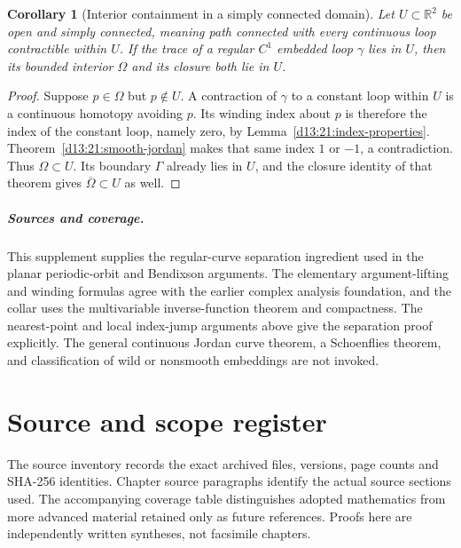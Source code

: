 \documentclass[11pt,oneside]{book}
\newtheorem{corollary}[theorem]{Corollary}
\theoremstyle{definition}
\theoremstyle{remark}\newtheorem{remark}[theorem]{Remark}
\newcommand{\R}{\mathbb R}\newcommand{\C}{\mathbb C}
\begin{document}
\begin{corollary}[Interior containment in a simply connected domain]\label{d13:21:domain-interior}
Let $U\subset\R^2$ be open and simply connected, meaning path connected
with every continuous loop contractible within $U$. If the trace of a
regular $C^1$ embedded loop $\gamma$ lies in $U$, then its bounded
interior $\Omega$ and its closure both lie in $U$.
\end{corollary}
\begin{proof}
Suppose $p\in\Omega$ but $p\notin U$. A contraction of $\gamma$
to a constant loop within $U$ is a continuous homotopy avoiding $p$.
Its winding index about $p$ is therefore the index of the constant
loop, namely zero, by Lemma~\ref{d13:21:index-properties}.
Theorem~\ref{d13:21:smooth-jordan} makes that same index $1$ or $-1$,
a contradiction. Thus $\Omega\subset U$. Its boundary $\Gamma$
already lies in $U$, and the closure identity of that theorem gives
$\overline\Omega\subset U$ as well.
\end{proof}

\paragraph{Sources and coverage.}
This supplement supplies the regular-curve separation ingredient used
in the planar periodic-orbit and Bendixson arguments. The elementary
argument-lifting and winding formulas agree with the earlier complex
analysis foundation, and the collar uses the multivariable
inverse-function theorem and compactness. The nearest-point and local
index-jump arguments above give the separation proof explicitly. The
general continuous Jordan curve theorem, a Schoenflies theorem, and
classification of wild or nonsmooth embeddings are not invoked.


\backmatter

\chapter*{Source and scope register}
The source inventory records the exact archived files, versions, page counts
and SHA-256 identities. Chapter source paragraphs identify the actual source
sections used. The accompanying coverage table distinguishes adopted
mathematics from more advanced material retained only as future references.
Proofs here are independently written syntheses, not facsimile chapters.
\end{document}
